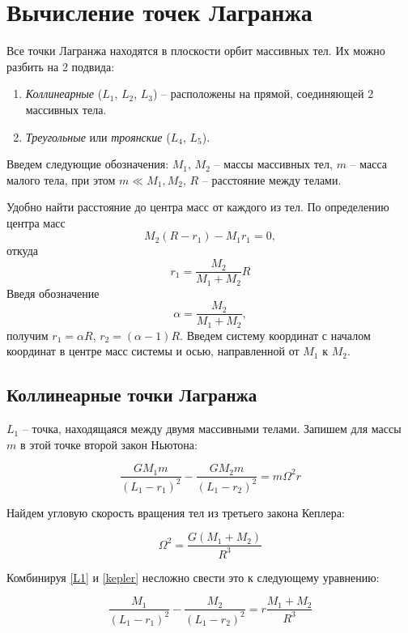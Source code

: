 \documentclass[12pt]{article}
\begin{document}
    \section{Вычисление точек Лагранжа}
    Все точки Лагранжа находятся в плоскости орбит массивных тел. Их можно
    разбить на 2 подвида:
    \begin{enumerate}
        \item \textit{Коллинеарные} ($L_1$, $L_2$, $L_3$) -- расположены на прямой,
        соединяющей 2 массивных тела.
        \item \textit{Треугольные} или \textit{троянские} ($L_4$, $L_5$).
    \end{enumerate}
    \par Введем следующие обозначения: $M_1$, $M_2$ -- массы массивных тел,
    $m$ -- масса малого тела, при этом $m \ll M_1, M_2$, $R$ -- расстояние
    между телами.
    \par Удобно найти расстояние до центра масс от каждого из тел. По
    определению центра масс
    $$ M_2(R - r_1) - M_1r_1 = 0, $$
    откуда
    $$ r_1 = \frac{M_2}{M_1 + M_2}R $$
    Введя обозначение
    $$ \alpha = \frac{M_2}{M_1 + M_2}, $$
    получим $r_1 = \alpha R$, $r_2 = (\alpha - 1)R$.
    Введем систему координат с началом координат в центре масс системы
    и осью, направленной от $M_1$ к $M_2$.

    \subsection{Коллинеарные точки Лагранжа}
    \par $L_1$ -- точка, находящаяся между двумя массивными телами. Запишем для
    массы $m$ в этой точке второй закон Ньютона:

    \begin{equation}
        \frac{GM_1m}{(L_1 - r_1)^2} - \frac{GM_2m}{(L_1 - r_2)^2} = m\Omega^2r
        \label{L1}
    \end{equation}

    \par Найдем угловую скорость вращения тел из третьего закона Кеплера:

    \begin{equation}
        \Omega^2 = \frac{G(M_1 + M_2)}{R^3}
        \label{kepler}
    \end{equation}

    Комбинируя \ref{L1} и \ref{kepler} несложно свести это к
    следующему уравнению:

    \begin{equation}
        \frac{M_1}{(L_1 - r_1)^2} - \frac{M_2}{(L_1 - r_2)^2} =
        r\frac{M_1 + M_2}{R^3}
        \label{eq1}
    \end{equation}
\end{document}
